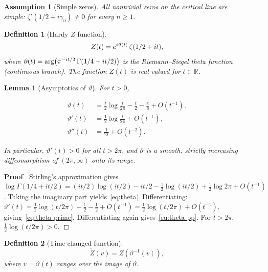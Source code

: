 \documentclass{article}
\newenvironment{proof}{\noindent\textbf{Proof\ }}{\hspace*{\fill}$\Box$\medskip}
\newtheorem{definition}{Definition}
\newtheorem{lemma}{Lemma}
\newtheorem{assumption}{Assumption}
\begin{document}
\begin{assumption}
  [Simple zeros]\label{ass:simple} All nontrivial zeros on the critical line
  are simple: $\zeta'  (1 / 2 + i \gamma_n) \ne 0$ for every $n \ge 1$.
\end{assumption}

\begin{definition}
  [Hardy $Z$-function]\label{def:Z}
  \[ Z (t) = e^{i \vartheta (t)}  \hspace{0.17em} \zeta (1 / 2 + it), \]
  where $\vartheta (t) = \arg \hspace{-0.17em} \left( \pi^{- it / 2} 
  \hspace{0.17em} \Gamma (1 / 4 + it / 2) \right)$ is the Riemann--Siegel
  theta function (continuous branch). The function $Z (t)$ is real-valued for
  $t \in \mathbb{R}$.
\end{definition}

\begin{lemma}
  [Asymptotics of $\vartheta$]\label{lem:theta-asymp} For $t > 0$,
  
  \begin{align}
    \vartheta (t) & = \frac{t}{2} \log \frac{t}{2 \pi} - \frac{t}{2} -
    \frac{\pi}{8} + O (t^{- 1}),  \label{eq:theta}\\
    \vartheta' (t) & = \frac{1}{2} \log \frac{t}{2 \pi} + O (t^{- 1}), 
    \label{eq:theta-prime}\\
    \vartheta'' (t) & = \frac{1}{2 t} + O (t^{- 2}) .  \label{eq:theta-pp}
  \end{align}
  
  In particular, $\vartheta' (t) > 0$ for all $t > 2 \pi$, and $\vartheta$ is
  a smooth, strictly increasing diffeomorphism of $(2 \pi, \infty)$ onto its
  range.
\end{lemma}

\begin{proof}
  Stirling's approximation gives $\log \Gamma (1 / 4 + it / 2) = (it / 2) \log
  (it / 2) - it / 2 - \tfrac{1}{2} \log (it / 2) + \tfrac{1}{2} \log 2 \pi + O
  (t^{- 1})$. Taking the imaginary part yields~\eqref{eq:theta}.
  Differentiating: $\vartheta' (t) = \tfrac{1}{2} \log (t / 2 \pi) +
  \tfrac{1}{2} - \tfrac{1}{2} + O (t^{- 1}) = \tfrac{1}{2} \log (t / 2 \pi) +
  O (t^{- 1})$, giving~\eqref{eq:theta-prime}. Differentiating again
  gives~\eqref{eq:theta-pp}. For $t > 2 \pi$, $\tfrac{1}{2} \log (t / 2 \pi) >
  0$.
\end{proof}

\begin{definition}
  [Time-changed function]\label{def:Ztilde}
  \[ \tilde{Z} (v) = Z (\vartheta^{- 1} (v)), \]
  where $v = \vartheta (t)$ ranges over the image of $\vartheta$.
\end{definition}
\end{document}
